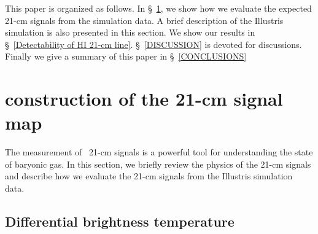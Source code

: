 \documentclass[a4paper,fleqn,usenatbib,useAMS]{mnras}
\begin{document}
This paper is organized as follows. 
In \S~\ref{METHOD}, we show how we evaluate the expected 
21-cm signals from the simulation data. 
A brief description of the Illustris simulation is also presented in this section. 
We show our results in \S~\ref{Detectability of HI 21-cm line}. 
\S~\ref{DISCUSSION} is devoted for discussions. 
Finally we give a summary of this paper in \S~\ref{CONCLUSIONS}

\section{construction of the 21-cm signal map}\label{METHOD}

The measurement of~ 21-cm signals is a powerful tool for
understanding the state of baryonic gas.
In this section, we briefly review the physics of the  21-cm
signals and describe how we evaluate the  21-cm signals from the
Illustris simulation data. 

\subsection{Differential brightness temperature}\label{Differential brightness temperature} 
\end{document}
